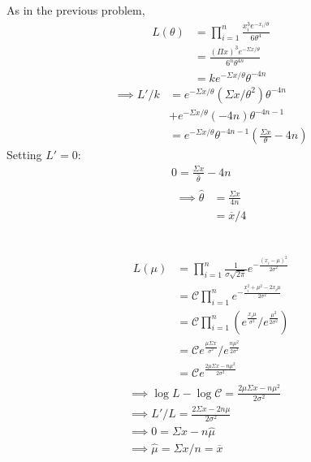 \documentclass[twocolumn]{article}
\begin{document}
As in the previous problem,
\begin{align*}
L(\theta)&=\prod_{i=1}^n\frac{x_i^3e^{-x_i/\theta}}{6\theta^4}\\
&=\frac{(\Pi x)^3e^{-\Sigma x/\theta}}{6^n\theta^{4n}}\\
&=ke^{-\Sigma x/\theta}\theta^{-4n}
\end{align*}
\begin{align*}
\implies L'/k&=e^{-\Sigma x/\theta}\left(\Sigma x/\theta^2\right)\theta^{-4n}\\
&+e^{-\Sigma x/\theta}(-4n)\theta^{-4n-1}\\
&=e^{-\Sigma x/\theta}\theta^{-4n-1}\left(\frac{\Sigma x}{\theta}-4n\right)
\end{align*}
Setting $L'=0$:
\begin{gather*}
0=\frac{\Sigma x}{\hat{\theta}}-4n\\
\begin{aligned}
\implies \hat{\theta}&=\frac{\Sigma x}{4n}\\
&=\overline{x}/4
\end{aligned}
\end{gather*}

\subsection{}\begin{gather*}
\begin{aligned}
L(\mu)&=\prod_{i=1}^n\frac{1}{\sigma\sqrt{2\pi}}e^{-\frac{(x_i-\mu)^2}{2\sigma^2}}\\
&=\mathcal{C}\prod_{i=1}^ne^{-\frac{x_i^2+\mu^2-2x_i\mu}{2\sigma^2}}\\
&=\mathcal{C}\prod_{i=1}^n(e^{\frac{x_i\mu}{\sigma^2}}/e^{\frac{\mu^2}{2\sigma^2}})\\
&=\mathcal{C}e^{\frac{\mu\Sigma x}{\sigma^2}}/e^{\frac{n\mu^2}{2\sigma^2}}\\
&=\mathcal{C}e^\frac{2\mu\Sigma x-n\mu^2}{2\sigma^2}
\end{aligned}\\
\implies \log L-\log\mathcal{C}=\frac{2\mu\Sigma x-n\mu^2}{2\sigma^2}\\
\implies L'/L=\frac{2\Sigma x- 2n\mu}{2\sigma^2}\\
\implies 0=\Sigma x-n\hat{\mu}\\
\implies \hat{\mu}=\Sigma x/n=\overline{x}
\end{gather*}
\end{document}
